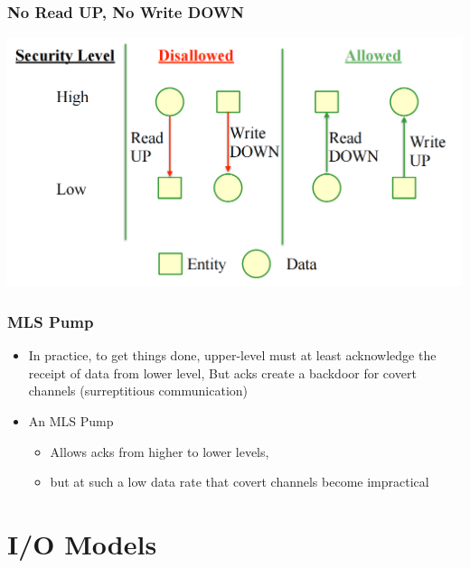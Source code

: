 \documentclass[12pt]{article}
\begin{document}
\subsubsection{No Read UP, No Write DOWN}
\includegraphics[width=\textwidth]{NoReadUPNoWriteDOWN.png}
\subsubsection{MLS Pump}
\begin{itemize}
    \item In practice, to get things done, upper-level must at least acknowledge the receipt of data from lower level, But acks create a backdoor for covert channels (surreptitious communication)
    \item An MLS Pump \begin{itemize}
        \item Allows acks from higher to lower levels, 
        \item but at such a low data rate that covert channels become impractical
    \end{itemize}
\end{itemize}

\section{I/O Models}
\end{document}
